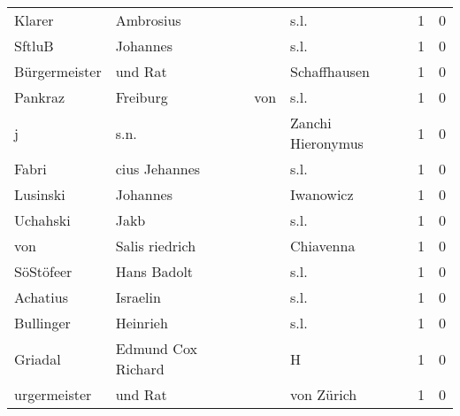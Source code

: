 \documentclass[10pt,a4paper,landscape]{article}
\begin{document}
\begin{longtable}{llllrr}
                   Klarer &                          Ambrosius &             &                                        s.l. &          1 &         0 \\
                   SftluB &                           Johannes &             &                                        s.l. &          1 &         0 \\
            Bürgermeister &                            und Rat &             &                                Schaffhausen &          1 &         0 \\
                  Pankraz &                           Freiburg &         von &                                        s.l. &          1 &         0 \\
                        j &                               s.n. &             &                           Zanchi Hieronymus &          1 &         0 \\
                    Fabri &                      cius Jehannes &             &                                        s.l. &          1 &         0 \\
                 Lusinski &                           Johannes &             &                                   Iwanowicz &          1 &         0 \\
                 Uchahski &                               Jakb &             &                                        s.l. &          1 &         0 \\
                      von &                     Salis riedrich &             &                                   Chiavenna &          1 &         0 \\
                SöStöfeer &                        Hans Badolt &             &                                        s.l. &          1 &         0 \\
                 Achatius &                           Israelin &             &                                        s.l. &          1 &         0 \\
                Bullinger &                           Heinrieh &             &                                        s.l. &          1 &         0 \\
                  Griadal &                 Edmund Cox Richard &             &                                           H &          1 &         0 \\
             urgermeister &                            und Rat &             &                                  von Zürich &          1 &         0 \\
\bottomrule
\end{longtable}
\end{document}
